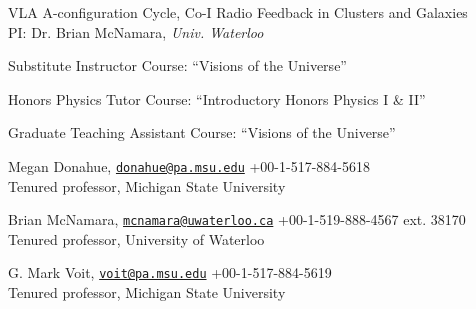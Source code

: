 \documentclass[12pt]{cv}
\begin{document}
\begin{llist}
VLA A-configuration Cycle, Co-I
Radio Feedback in Clusters and Galaxies\\%
PI: Dr. Brian McNamara, {\textit{Univ. Waterloo}}





Substitute Instructor
Course: ``Visions of the Universe''

Honors Physics Tutor
Course: ``Introductory Honors Physics I \& II''

Graduate Teaching Assistant
Course: ``Visions of the Universe''




Megan Donahue, \href{mailto:donahue@pa.msu.edu}{\tt donahue@pa.msu.edu} \hfill +00-1-517-884-5618\\
Tenured professor, Michigan State University

Brian McNamara, \href{mailto:mcnamara@uwaterloo.ca}{\tt mcnamara@uwaterloo.ca} \hfill +00-1-519-888-4567 ext. 38170\\
Tenured professor, University of Waterloo

G. Mark Voit, \href{mailto:voit@pa.msu.edu}{\tt voit@pa.msu.edu} \hfill +00-1-517-884-5619\\
Tenured professor, Michigan State University


\end{llist}
\end{document}
